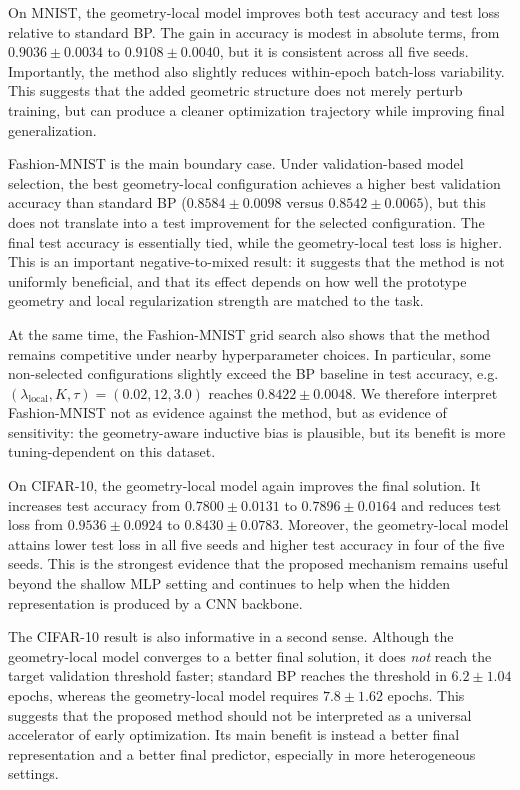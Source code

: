 \documentclass{article}
\theoremstyle{definition}
\theoremstyle{remark}
\begin{document}
On MNIST, the geometry-local model improves both test accuracy and test loss relative to standard BP. The gain in accuracy is modest in absolute terms, from $0.9036 \pm 0.0034$ to $0.9108 \pm 0.0040$, but it is consistent across all five seeds. Importantly, the method also slightly reduces within-epoch batch-loss variability. This suggests that the added geometric structure does not merely perturb training, but can produce a cleaner optimization trajectory while improving final generalization.

Fashion-MNIST is the main boundary case. Under validation-based model selection, the best geometry-local configuration achieves a higher best validation accuracy than standard BP ($0.8584 \pm 0.0098$ versus $0.8542 \pm 0.0065$), but this does not translate into a test improvement for the selected configuration. The final test accuracy is essentially tied, while the geometry-local test loss is higher. This is an important negative-to-mixed result: it suggests that the method is not uniformly beneficial, and that its effect depends on how well the prototype geometry and local regularization strength are matched to the task.

At the same time, the Fashion-MNIST grid search also shows that the method remains competitive under nearby hyperparameter choices. In particular, some non-selected configurations slightly exceed the BP baseline in test accuracy, e.g. $(\lambda_{\mathrm{local}}, K, \tau) = (0.02, 12, 3.0)$ reaches $0.8422 \pm 0.0048$. We therefore interpret Fashion-MNIST not as evidence against the method, but as evidence of sensitivity: the geometry-aware inductive bias is plausible, but its benefit is more tuning-dependent on this dataset.

On CIFAR-10, the geometry-local model again improves the final solution. It increases test accuracy from $0.7800 \pm 0.0131$ to $0.7896 \pm 0.0164$ and reduces test loss from $0.9536 \pm 0.0924$ to $0.8430 \pm 0.0783$. Moreover, the geometry-local model attains lower test loss in all five seeds and higher test accuracy in four of the five seeds. This is the strongest evidence that the proposed mechanism remains useful beyond the shallow MLP setting and continues to help when the hidden representation is produced by a CNN backbone.

The CIFAR-10 result is also informative in a second sense. Although the geometry-local model converges to a better final solution, it does \emph{not} reach the target validation threshold faster; standard BP reaches the threshold in $6.2 \pm 1.04$ epochs, whereas the geometry-local model requires $7.8 \pm 1.62$ epochs. This suggests that the proposed method should not be interpreted as a universal accelerator of early optimization. Its main benefit is instead a better final representation and a better final predictor, especially in more heterogeneous settings.
\end{document}

